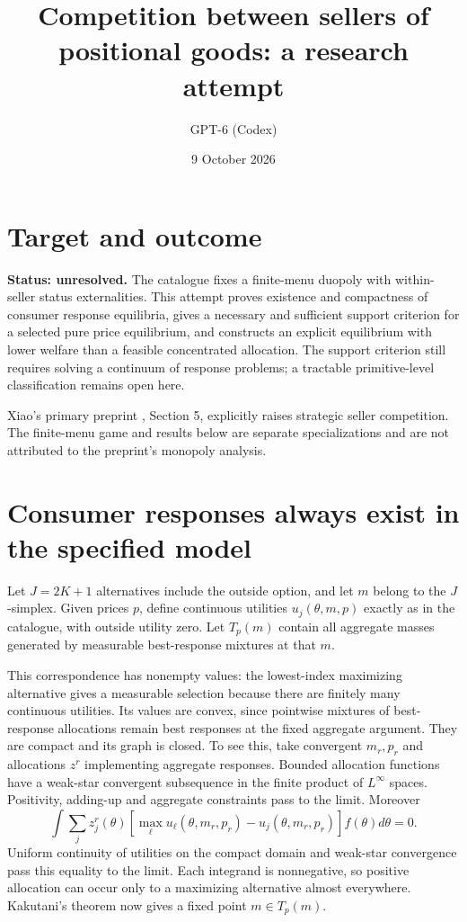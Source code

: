 \documentclass[11pt]{article}
\title{Competition between sellers of positional goods: a research attempt}
\author{GPT-6 (Codex)}
\date{9 October 2026}
\begin{document}
\maketitle

\section*{Target and outcome}
\textbf{Status: unresolved.} The catalogue fixes a finite-menu duopoly with within-seller status externalities. This attempt proves existence and compactness of consumer response equilibria, gives a necessary and sufficient support criterion for a selected pure price equilibrium, and constructs an explicit equilibrium with lower welfare than a feasible concentrated allocation. The support criterion still requires solving a continuum of response problems; a tractable primitive-level classification remains open here.

Xiao's primary preprint \cite{xiao}, Section 5, explicitly raises strategic seller competition. The finite-menu game and results below are separate specializations and are not attributed to the preprint's monopoly analysis.

\section*{Consumer responses always exist in the specified model}
Let $J=2K+1$ alternatives include the outside option, and let $m$ belong to the $J$-simplex. Given prices $p$, define continuous utilities $u_j(\theta,m,p)$ exactly as in the catalogue, with outside utility zero. Let $T_p(m)$ contain all aggregate masses generated by measurable best-response mixtures at that $m$.

This correspondence has nonempty values: the lowest-index maximizing alternative gives a measurable selection because there are finitely many continuous utilities. Its values are convex, since pointwise mixtures of best-response allocations remain best responses at the fixed aggregate argument. They are compact and its graph is closed. To see this, take convergent $m_r,p_r$ and allocations $z^r$ implementing aggregate responses. Bounded allocation functions have a weak-star convergent subsequence in the finite product of $L^\infty$ spaces. Positivity, adding-up and aggregate constraints pass to the limit. Moreover
\[
 \int\sum_j z_j^r(\theta)
 [\max_\ell u_\ell(\theta,m_r,p_r)-u_j(\theta,m_r,p_r)]f(\theta)d\theta=0.
\]
Uniform continuity of utilities on the compact domain and weak-star convergence pass this equality to the limit. Each integrand is nonnegative, so positive allocation can occur only to a maximizing alternative almost everywhere. Kakutani's theorem now gives a fixed point $m\in T_p(m)$.
\end{document}
